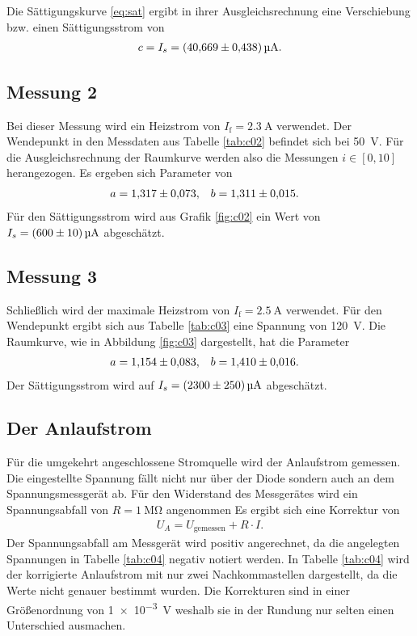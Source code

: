 Die Sättigungskurve \eqref{eq:sat} ergibt in ihrer Ausgleichsrechnung eine Verschiebung bzw. einen Sättigungsstrom von 
\begin{align}
    c= I_s = \qty{40.669 \pm 0.438}{\micro\ampere}.
\end{align}


\subsection{Messung 2}


Bei dieser Messung wird ein Heizstrom von $I_\text{f}= \qty{2.3}{\ampere}$ verwendet.
Der Wendepunkt in den Messdaten aus Tabelle \ref{tab:c02} befindet sich bei \qty{50}{\volt}.
Für die Ausgleichsrechnung der Raumkurve werden also die Messungen $i \in [0,10]$ herangezogen.
Es ergeben sich Parameter von
\begin{align}
    a &= \num{1.317 \pm 0.073}, & b &= \num{1.311 \pm 0.015}.
\end{align}
Für den Sättigungsstrom wird aus Grafik \ref{fig:c02} ein Wert von $I_s = \qty{600 \pm 10}{\micro\ampere}$ abgeschätzt.


\subsection{Messung 3}


Schließlich wird der maximale Heizstrom von $I_\text{f}= \qty{2.5}{\ampere}$ verwendet.
Für den Wendepunkt ergibt sich aus Tabelle \ref{tab:c03} eine Spannung von \qty{120}{\volt}.
Die Raumkurve, wie in Abbildung \ref{fig:c03} dargestellt, hat die Parameter
\begin{align}
    a &= \num{1.154 \pm 0.083}, & b &= \num{1.410 \pm 0.016}.
\end{align}
Der Sättigungsstrom wird auf $I_s= \qty{2300 \pm 250}{\micro\ampere}$ abgeschätzt.






\subsection{Der Anlaufstrom}



Für die umgekehrt angeschlossene Stromquelle wird der Anlaufstrom gemessen.
Die eingestellte Spannung fällt nicht nur über der Diode sondern auch an dem Spannungsmessgerät ab.
Für den Widerstand des Messgerätes wird ein Spannungsabfall von $R = \qty{1}{\mega\ohm}$ angenommen
Es ergibt sich eine Korrektur von
\begin{align}
    U_A = U_\text{gemessen} + R \cdot I.
\end{align}
Der Spannungsabfall am Messgerät wird positiv angerechnet, da die angelegten Spannungen in Tabelle \ref{tab:c04} negativ notiert werden.
In Tabelle \ref{tab:c04} wird der korrigierte Anlaufstrom mit nur zwei Nachkommastellen dargestellt, da die Werte nicht genauer bestimmt wurden.
Die Korrekturen sind in einer Größenordnung von \qty{1e-3}{\volt} weshalb sie in der Rundung nur selten einen Unterschied ausmachen.

